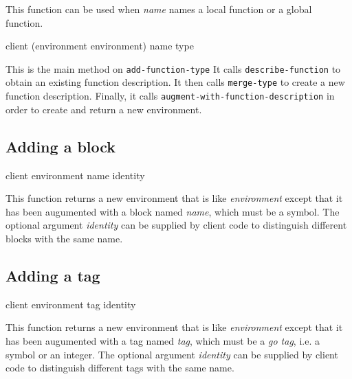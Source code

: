This function can be used when \textit{name} names a local function or
a global function.

{\footnotesize
{}
{client
 (environment environment)
 name
 type}
}

This is the main method on \texttt{add-function-type} It
calls \texttt{describe-function} to obtain an existing function
description.  It then calls \texttt{merge-type} to create a new
function description.  Finally, it calls
\texttt{augment-with-function-description} in order to create and
return a new environment.

\subsection{Adding a block}

{\footnotesize
{} {client environment name \optional identity}
}

This function returns a new environment that is like
\textit{environment} except that it has been augumented with a block
named \textit{name}, which must be a symbol.  The optional argument
\textit{identity} can be supplied by client code to distinguish
different blocks with the same name.

\subsection{Adding a tag}

{\footnotesize
{} {client environment tag \optional identity}
}

This function returns a new environment that is like
\textit{environment} except that it has been augumented with a tag
named \textit{tag}, which must be a \emph{go tag}, i.e. a symbol or an
integer.  The optional argument \textit{identity} can be supplied by
client code to distinguish different tags with the same name.
